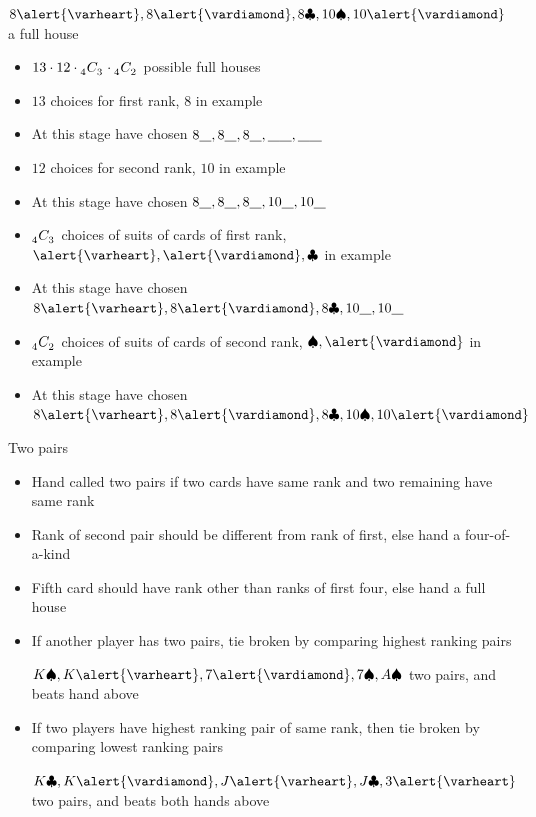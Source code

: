 \documentclass[handout]{beamer}
\theoremstyle{definition}
\newcommand\ncr[2]{\tensor[_{#1}]C{_{#2}}}
\newcommand{\hs}{\alert{\varheart}}
\newcommand{\ds}{\alert{\vardiamond}}
\newcommand{\s}{\spadesuit}
\newcommand{\cs}{\clubsuit}
\begin{document}
\begin{frame}
\newcommand{\bl}{\underline{\hspace{3mm}}}
\begin{example} $8\hs,8\ds,8\cs,10\s,10\ds$ a full house\end{example}
\begin{itemize}
\item $13\cdot 12\cdot\ncr{4}{3}\cdot\ncr{4}{2}$ possible full houses
\item $13$ choices for first rank, $8$ in example
\item At this stage have chosen
$8\bl,8\bl,8\bl,\bl\bl,\bl\bl$
\item $12$ choices for second rank, $10$ in example
\item At this stage have chosen
$8\bl,8\bl,8\bl,10\bl,10\bl$
\item $\ncr{4}{3}$ choices of suits of cards of first
rank, $\hs,\ds,\cs$ in example
\item At this stage have chosen
$8\hs,8\ds,8\cs,10\bl,10\bl$
\item $\ncr{4}{2}$ choices of suits of cards of second
rank, $\s,\ds$ in example
\item At this stage have chosen
$8\hs,8\ds,8\cs,10\s,10\ds$
\end{itemize}
\end{frame}

\begin{frame}{Two pairs}
\begin{itemize}
\item Hand called \alert{two pairs} if two
cards have same rank and two remaining have same rank
\item Rank of second pair should be different from rank of first,
else hand a four-of-a-kind
\item Fifth card should have rank other than ranks
of first four, else hand a full house
\end{itemize}
\end{frame}

\begin{frame}
\begin{itemize}
\begin{example} $2\hs,2\ds,Q\cs,Q\s,10\ds$ two pairs\end{example}
\item If another player has two pairs, tie broken
by comparing highest ranking pairs
\begin{example} $K\s,K\hs,7\ds,7\s,A\s$ two pairs,
and beats hand above\end{example}
\item If two players have
highest ranking pair of same rank, then tie broken
by comparing lowest ranking pairs
\begin{example} $K\cs,K\ds,J\hs,J\cs,3\hs$ two pairs,
and beats both hands above\end{example}
\end{itemize}
\end{frame}
\end{document}
